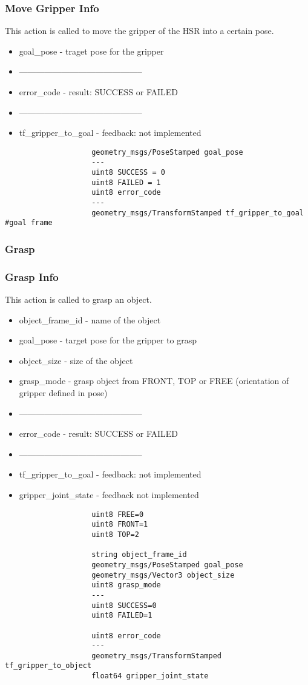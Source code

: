 \documentclass[main.tex]{subfiles}
\begin{document}
				\subsubsection{Move Gripper Info}
				This action is called to move the gripper of the HSR into a certain pose.
				\begin{itemize}
					\item goal\_pose - traget pose for the gripper
					\item --------------------------------------------
					\item error\_code - result: SUCCESS or FAILED
					\item --------------------------------------------
					\item tf\_gripper\_to\_goal - feedback: not implemented
				\end{itemize}
					\begin{lstlisting}
					geometry_msgs/PoseStamped goal_pose
					---
					uint8 SUCCESS = 0
					uint8 FAILED = 1
					uint8 error_code
					---
					geometry_msgs/TransformStamped tf_gripper_to_goal #goal frame
					\end{lstlisting}
				\subsubsection{Grasp}
				\subsubsection{Grasp Info}
				This action is called to grasp an object.
				\begin{itemize}
					\item object\_frame\_id - name of the object
					\item goal\_pose - target pose for the gripper to grasp
					\item object\_size - size of the object
					\item grasp\_mode - grasp object from FRONT, TOP or FREE (orientation of gripper defined in pose)
					\item --------------------------------------------
					\item error\_code - result: SUCCESS or FAILED
					\item --------------------------------------------
					\item tf\_gripper\_to\_goal - feedback: not implemented
					\item gripper\_joint\_state - feedback not implemented
				\end{itemize}
					\begin{lstlisting}
					uint8 FREE=0
					uint8 FRONT=1
					uint8 TOP=2
		
					string object_frame_id
					geometry_msgs/PoseStamped goal_pose 
					geometry_msgs/Vector3 object_size
					uint8 grasp_mode
					---
					uint8 SUCCESS=0
					uint8 FAILED=1
		
					uint8 error_code
					---
					geometry_msgs/TransformStamped tf_gripper_to_object
					float64 gripper_joint_state
					\end{lstlisting}
\end{document}
